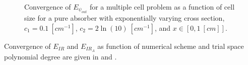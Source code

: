 \begin{figure}[!htp]
\begin{center}
{}
\end{center}
\caption{Convergence of $E_{\psi_{out}}$ for a multiple cell problem as a function of cell size for a pure absorber with exponentially varying cross section, $c_1 = 0.1~[cm^{-1}]$, $c_2 = 2\ln(10)~[cm^{-1}]$, and $x\in \left[0,1~[cm] \right]$.}
\label{fig:varxs_psi_out}
\end{figure}
%
%
Convergence of $E_{IR}$ and $E_{IR_A}$ as function of numerical scheme and trial space polynomial degree are given in  and . 
%
%
